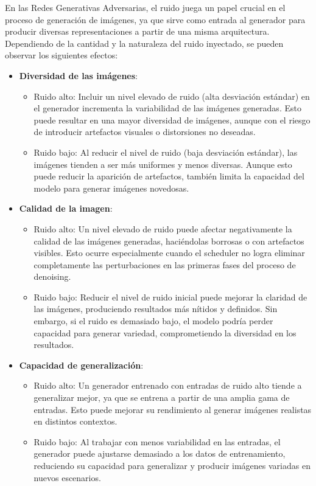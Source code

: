 En las Redes Generativas Adversarias, el ruido juega un papel crucial en el proceso de generación de imágenes, ya que sirve como entrada al generador para producir diversas representaciones a partir de una misma arquitectura. Dependiendo de la cantidad y la naturaleza del ruido inyectado, se pueden observar los siguientes efectos:
\begin{itemize}
    \item \textbf{Diversidad de las imágenes}:
    \begin{itemize}
        \item Ruido alto: Incluir un nivel elevado de ruido (alta desviación estándar) en el generador incrementa la variabilidad de las imágenes generadas. Esto puede resultar en una mayor diversidad de imágenes, aunque con el riesgo de introducir artefactos visuales o distorsiones no deseadas.
        \item Ruido bajo: Al reducir el nivel de ruido (baja desviación estándar), las imágenes tienden a ser más uniformes y menos diversas. Aunque esto puede reducir la aparición de artefactos, también limita la capacidad del modelo para generar imágenes novedosas.
    \end{itemize}
    
    \item \textbf{Calidad de la imagen}:
    \begin{itemize}
        \item Ruido alto: Un nivel elevado de ruido puede afectar negativamente la calidad de las imágenes generadas, haciéndolas borrosas o con artefactos visibles. Esto ocurre especialmente cuando el scheduler no logra eliminar completamente las perturbaciones en las primeras fases del proceso de denoising.
        \item Ruido bajo: Reducir el nivel de ruido inicial puede mejorar la claridad de las imágenes, produciendo resultados más nítidos y definidos. Sin embargo, si el ruido es demasiado bajo, el modelo podría perder capacidad para generar variedad, comprometiendo la diversidad en los resultados.
    \end{itemize}

    \item \textbf{Capacidad de generalización}:
    \begin{itemize}
        \item Ruido alto: Un generador entrenado con entradas de ruido alto tiende a generalizar mejor, ya que se entrena a partir de una amplia gama de entradas. Esto puede mejorar su rendimiento al generar imágenes realistas en distintos contextos.
        \item Ruido bajo: Al trabajar con menos variabilidad en las entradas, el generador puede ajustarse demasiado a los datos de entrenamiento, reduciendo su capacidad para generalizar y producir imágenes variadas en nuevos escenarios.
    \end{itemize}


\end{itemize}
